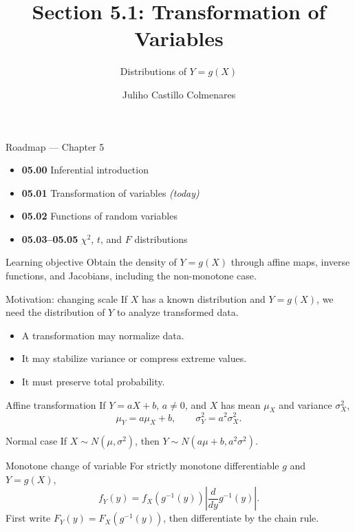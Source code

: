 \documentclass[10pt,aspectratio=169]{beamer}
\title[Transformation of Variables]{Section 5.1: Transformation of Variables}
\subtitle{Distributions of $Y=g(X)$}
\author[J. Castillo Colmenares]{Juliho Castillo Colmenares}
\institute{Tecnológico de Monterrey}
\date{}
\begin{document}
\begin{frame}[plain]\vspace{-0.8cm}\titlepage\end{frame}

\begin{frame}{Roadmap --- Chapter 5}
  \footnotesize
  \begin{itemize}\itemsep=0.08cm
    \item \textbf{05.00} Inferential introduction
    \item \textbf{05.01} Transformation of variables \emph{(today)}
    \item \textbf{05.02} Functions of random variables
    \item \textbf{05.03--05.05} $\chi^2$, $t$, and $F$ distributions
  \end{itemize}
  \begin{block}{Learning objective}
    Obtain the density of $Y=g(X)$ through affine maps, inverse functions, and
    Jacobians, including the non-monotone case.
  \end{block}
\end{frame}

\begin{frame}{Motivation: changing scale}
  \footnotesize
  If $X$ has a known distribution and $Y=g(X)$, we need the distribution of $Y$
  to analyze transformed data.
  \begin{itemize}\itemsep=0.12cm
    \item A transformation may normalize data.
    \item It may stabilize variance or compress extreme values.
    \item It must preserve total probability.
  \end{itemize}
\end{frame}

\begin{frame}{Affine transformation}
  \footnotesize
  If $Y=aX+b$, $a\neq0$, and $X$ has mean $\mu_X$ and variance $\sigma_X^2$,
  \[
    \mu_Y=a\mu_X+b,\qquad \sigma_Y^2=a^2\sigma_X^2.
  \]
  \begin{alertblock}{Normal case}
    If $X\sim N(\mu,\sigma^2)$, then $Y\sim N(a\mu+b,a^2\sigma^2)$.
  \end{alertblock}
\end{frame}

\begin{frame}{Monotone change of variable}
  \footnotesize
  For strictly monotone differentiable $g$ and $Y=g(X)$,
  \[
    f_Y(y)=f_X\!\left(g^{-1}(y)\right)
    \left|\frac{d}{dy}g^{-1}(y)\right|.
  \]
  First write $F_Y(y)=F_X(g^{-1}(y))$, then differentiate by the chain rule.
\end{frame}
\end{document}
